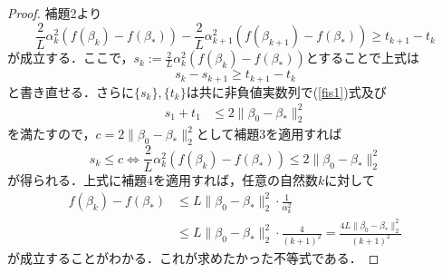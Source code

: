 \documentclass{jsarticle}
\theoremstyle{definition}
\theoremstyle{mystyle} %
\begin{document}
\begin{proof}
補題2より
$$\frac{2}{L}\alpha_k^2(f(\beta_k)-f(\beta_{\ast}))-\frac{2}{L}\alpha_{k+1}^2(f(\beta_{k+1})-f(\beta_{\ast}))\geq t_{k+1}-t_k$$
が成立する．ここで，$s_k:=\frac{2}{L}\alpha_k^2(f(\beta_k)-f(\beta_{\ast}))$とすることで上式は
\begin{equation}
\label{fis1}
s_{k}-s_{k+1}\geq t_{k+1}-t_{k}
\end{equation}
と書き直せる．さらに$\{s_k\},\{t_k\}$は共に非負値実数列で(\ref{fis1})式及び
\begin{align*}
s_1+t_1&\leq2\|\beta_0-\beta_{\ast}\|_2^2
\end{align*}
を満たすので，$c=2\|\beta_0-\beta_{\ast}\|_2^2$として補題3を適用すれば
$$s_k\leq c\Leftrightarrow \frac{2}{L}\alpha_k^2(f(\beta_k)-f(\beta_{\ast}))\leq 2\|\beta_0-\beta_{\ast}\|_2^2$$
が得られる．上式に補題4を適用すれば，任意の自然数$k$に対して
\begin{align*}
f(\beta_k)-f(\beta_{\ast})&\leq L\|\beta_0-\beta_{\ast}\|_2^2\cdot \frac{1}{\alpha_k^2}\\
&\leq L\|\beta_0-\beta_{\ast}\|_2^2\cdot \frac{4}{(k+1)^2}=\frac{4L\|\beta_0-\beta_{\ast}\|_2^2}{(k+1)^2}
\end{align*}
が成立することがわかる．これが求めたかった不等式である．
\end{proof}
\end{document}
